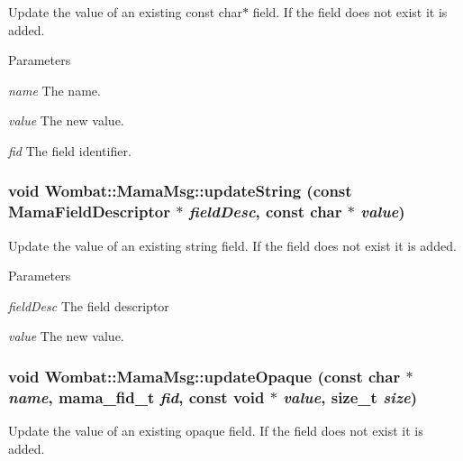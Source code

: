 Update the value of an existing const char$\ast$ field. If the field does not exist it is added.


\begin{DoxyParams}{Parameters}
\item[{\em name}]The name. \item[{\em value}]The new value. \item[{\em fid}]The field identifier. \end{DoxyParams}
\hypertarget{classWombat_1_1MamaMsg_af7933f60c7c10d73524e6a2d5e5c7d20}{
\subsubsection[{updateString}]{\setlength{\rightskip}{0pt plus 5cm}void Wombat::MamaMsg::updateString (const {\bf MamaFieldDescriptor} $\ast$ {\em fieldDesc}, \/  const char $\ast$ {\em value})}}
\label{classWombat_1_1MamaMsg_af7933f60c7c10d73524e6a2d5e5c7d20}


Update the value of an existing string field. If the field does not exist it is added.


\begin{DoxyParams}{Parameters}
\item[{\em fieldDesc}]The field descriptor \item[{\em value}]The new value. \end{DoxyParams}
\hypertarget{classWombat_1_1MamaMsg_ac59a35a3f35aead851372af2cba9dd97}{
\subsubsection[{updateOpaque}]{\setlength{\rightskip}{0pt plus 5cm}void Wombat::MamaMsg::updateOpaque (const char $\ast$ {\em name}, \/  mama\_\-fid\_\-t {\em fid}, \/  const void $\ast$ {\em value}, \/  size\_\-t {\em size})}}
\label{classWombat_1_1MamaMsg_ac59a35a3f35aead851372af2cba9dd97}


Update the value of an existing opaque field. If the field does not exist it is added.


